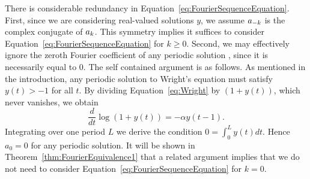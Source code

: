 \begin{remark}\label{r:a0}
There is considerable redundancy in Equation~\eqref{eq:FourierSequenceEquation}. First, since we are considering real-valued solutions $y$, we assume $a_{-k}$ is the complex conjugate of $a_k$. This symmetry implies it suffices to consider Equation~\eqref{eq:FourierSequenceEquation} for $k \geq 0$.
Second, we may effectively ignore the zeroth Fourier coefficient of any periodic solution \cite{jones1962existence}, since it is necessarily equal to $0$. 
		The self contained argument is as follows. 
		As mentioned in the introduction, any periodic solution to Wright's equation must satisfy $ y(t) > -1$ for all $t$. 
	By dividing Equation~\eqref{eq:Wright} by $(1+y(t))$, which never vanishes, we obtain
	\[
	\frac{d}{dt} \log (1 + y(t)) = - \alpha y(t-1).
	\]  
	Integrating over one period $L$ we derive the condition 
	$0=\int_0^L y(t) dt $.
	Hence $a_0=0$ for any periodic solution. 
	It will be shown in Theorem~\ref{thm:FourierEquivalence1} that a related argument implies that we do not need to consider Equation~\eqref{eq:FourierSequenceEquation} for $k=0$.
\end{remark}




